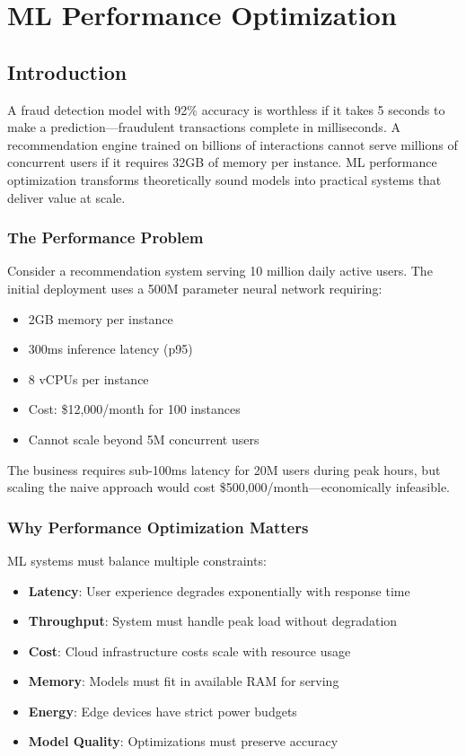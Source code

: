 \chapter{ML Performance Optimization}

\section{Introduction}

A fraud detection model with 92\% accuracy is worthless if it takes 5 seconds to make a prediction---fraudulent transactions complete in milliseconds. A recommendation engine trained on billions of interactions cannot serve millions of concurrent users if it requires 32GB of memory per instance. ML performance optimization transforms theoretically sound models into practical systems that deliver value at scale.

\subsection{The Performance Problem}

Consider a recommendation system serving 10 million daily active users. The initial deployment uses a 500M parameter neural network requiring:
\begin{itemize}
    \item 2GB memory per instance
    \item 300ms inference latency (p95)
    \item 8 vCPUs per instance
    \item Cost: \$12,000/month for 100 instances
    \item Cannot scale beyond 5M concurrent users
\end{itemize}

The business requires sub-100ms latency for 20M users during peak hours, but scaling the naive approach would cost \$500,000/month---economically infeasible.

\subsection{Why Performance Optimization Matters}

ML systems must balance multiple constraints:

\begin{itemize}
    \item \textbf{Latency}: User experience degrades exponentially with response time
    \item \textbf{Throughput}: System must handle peak load without degradation
    \item \textbf{Cost}: Cloud infrastructure costs scale with resource usage
    \item \textbf{Memory}: Models must fit in available RAM for serving
    \item \textbf{Energy}: Edge devices have strict power budgets
    \item \textbf{Model Quality}: Optimizations must preserve accuracy
\end{itemize}

